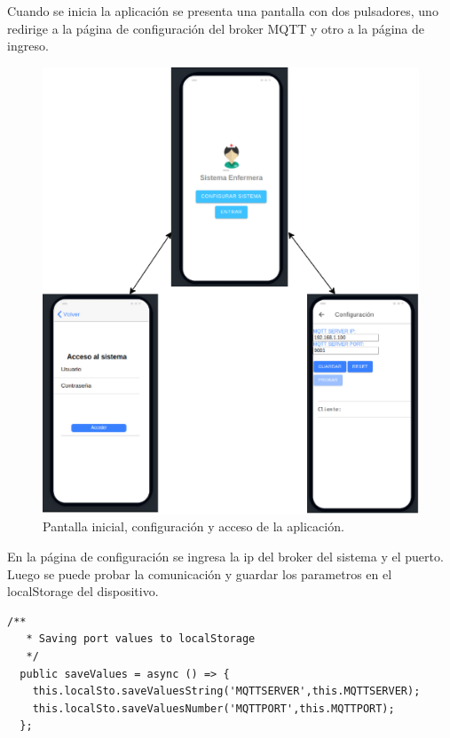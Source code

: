 Cuando se inicia la aplicación se presenta una pantalla con dos pulsadores, uno redirige a la página de configuración del broker MQTT y otro a la página de ingreso.
\begin{figure}[ht]
	\centering
	\includegraphics[scale=.80]{./Figures/app/inicioApp.png}
	\caption{ Pantalla inicial, configuración y acceso de la aplicación.}
	\label{fig: Pantalla inicial, configuración y acceso de la aplicación.}
\end{figure} 

En la página de configuración se ingresa la ip del broker del sistema y el puerto. Luego se puede probar la comunicación y guardar los parametros en el localStorage del dispositivo.

\begin{lstlisting}[caption=  Funciones del servicio que guardan en el localStorage]
  /**
   * Saving port values to localStorage
   */
  public saveValues = async () => {     
    this.localSto.saveValuesString('MQTTSERVER',this.MQTTSERVER);
    this.localSto.saveValuesNumber('MQTTPORT',this.MQTTPORT);
  };
\end{lstlisting}

